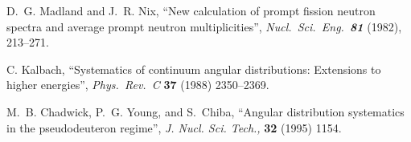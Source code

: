 \documentclass[11pt]{report}
\begin{document}
\begin{thebibliography}{99}
 D.~G. Madland and J.~R. Nix,
``New calculation of prompt fission neutron spectra
and average prompt neutron multiplicities'',
\textit{Nucl.\ Sci.\ Eng.\ \textbf{81}} (1982), 213--271.

 C. Kalbach, 
``Systematics of continuum angular distributions: 
Extensions to higher energies'',
\textit{Phys.\ Rev.~C} \textbf{37} (1988) 2350--2369.

 M.~B. Chadwick, P.~G. Young, and S.~Chiba,
``Angular distribution systematics in the pseudodeuteron regime'',
\textit{J. Nucl. Sci. Tech.,} \textbf{32} (1995) 1154.



\end{thebibliography}
\end{document}
